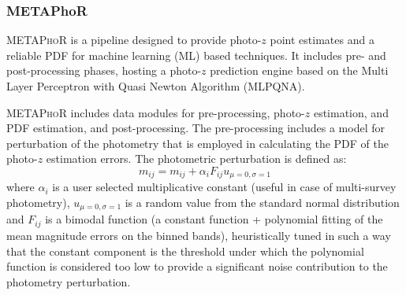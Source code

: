 \subsubsection{METAPhoR}
\label{sec:metaphor}
\textsc{METAPhoR} \citep[Machine-learning Estimation Tool for Accurate Photometric Redshifts,][]{Cavuoti:17} is a pipeline designed to provide photo-$z$ point estimates and a reliable PDF for machine learning (ML) based techniques.
It includes pre- and post-processing phases, hosting a photo-$z$ prediction engine based on the Multi Layer Perceptron with Quasi Newton Algorithm (MLPQNA).

\textsc{METAPhoR} includes data modules for pre-processing, photo-$z$ estimation, and PDF estimation, and post-processing.  The pre-processing includes a model for perturbation of the photometry that is employed in calculating the PDF of the photo-$z$ estimation errors.
The photometric perturbation is defined as:
\begin{equation}
 m_{ij} = m_{ij} + \alpha_{i}F_{ij}u_{\mu=0,\sigma=1}
\end{equation}
where $\alpha_{i}$ is a user selected multiplicative constant (useful in case of multi-survey photometry), $u_{\mu=0,\sigma=1}$ is a random value from the standard normal distribution and $F_{ij}$ is a bimodal function (a constant function + polynomial fitting of the mean magnitude errors on the binned bands), heuristically tuned in such a way that the constant component is the threshold under which the polynomial function is considered too low to provide a significant noise contribution to the photometry perturbation.


